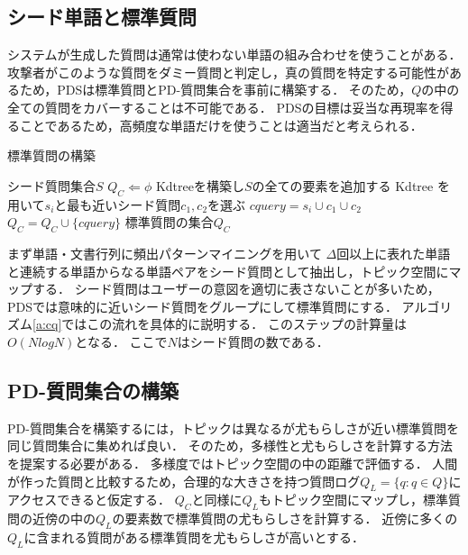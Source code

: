 \documentclass[master]{suribt}
\theoremstyle{definition}
\begin{document}
 \subsection{シード単語と標準質問}
 システムが生成した質問は通常は使わない単語の組み合わせを使うことがある．
 攻撃者がこのような質問をダミー質問と判定し，真の質問を特定する可能性があるため，PDSは標準質問とPD-質問集合を事前に構築する．
 そのため，$Q$の中の全ての質問をカバーすることは不可能である．
 PDSの目標は妥当な再現率を得ることであるため，高頻度な単語だけを使うことは適当だと考えられる．
 
 \begin{algorithm}
 \caption{標準質問の構築}
 \begin{algorithmic}[1]
  \Require シード質問集合$S$
  \State $Q_C \Leftarrow \phi$
  \State Kdtreeを構築し$S$の全ての要素を追加する
  \State Kdtree を用いて$s_i$と最も近いシード質問$c_1,c_2$を選ぶ
  \State $cquery = s_i \cup c_1 \cup c_2$
  \State $Q_C = Q_C \cup \{cquery\}$
  \EndIf
  \EndFor
  \Ensure 標準質問の集合$Q_C$
 \end{algorithmic}
 \label{a:cq}
 \end{algorithm}

 まず単語・文書行列に頻出パターンマイニング\cite{apriori2010}を用いて
 $\Delta$回以上に表れた単語と連続する単語からなる単語ペアをシード質問として抽出し，トピック空間にマップする．
 シード質問はユーザーの意図を適切に表さないことが多いため，
 PDSでは意味的に近いシード質問をグループにして標準質問にする．
 アルゴリズム\ref{a:cq}ではこの流れを具体的に説明する．
 このステップの計算量は$O(NlogN)$となる．
 ここで$N$はシード質問の数である．

 \subsection{PD-質問集合の構築}
 PD-質問集合を構築するには，トピックは異なるが尤もらしさが近い標準質問を同じ質問集合に集めれば良い．
 そのため，多様性と尤もらしさを計算する方法を提案する必要がある．
 多様度ではトピック空間の中の距離で評価する．
 人間が作った質問と比較するため，合理的な大きさを持つ質問ログ$Q_L = \{q: q \in Q\}$にアクセスできると仮定する．
 $Q_C$と同様に$Q_L$もトピック空間にマップし，標準質問の近傍の中の$Q_L$の要素数で標準質問の尤もらしさを計算する．
 近傍に多くの$Q_L$に含まれる質問がある標準質問を尤もらしさが高いとする．
\end{document}
